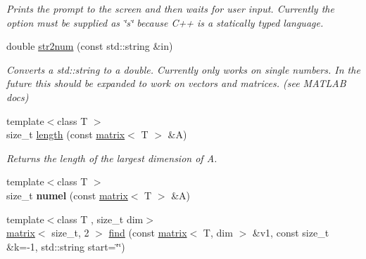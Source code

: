 \begin{DoxyCompactItemize}
\begin{DoxyCompactList}\small\item\em Prints the prompt to the screen and then waits for user input. Currently the option must be supplied as \char`\"{}s\char`\"{} because C++ is a statically typed language. \end{DoxyCompactList}\item 
\hypertarget{namespacekeycpp_a4bca7924aad17a920f2f5f0606e6d9a9}{double \hyperlink{namespacekeycpp_a4bca7924aad17a920f2f5f0606e6d9a9}{str2num} (const std\-::string \&in)}\label{namespacekeycpp_a4bca7924aad17a920f2f5f0606e6d9a9}

\begin{DoxyCompactList}\small\item\em Converts a std\-::string to a double. Currently only works on single numbers. In the future this should be expanded to work on vectors and matrices. (see M\-A\-T\-L\-A\-B docs) \end{DoxyCompactList}\item 
\hypertarget{namespacekeycpp_a9c30ad952d4422425a171c12bdf33947}{{\footnotesize template$<$class T $>$ }\\size\-\_\-t \hyperlink{namespacekeycpp_a9c30ad952d4422425a171c12bdf33947}{length} (const \hyperlink{classkeycpp_1_1matrix}{matrix}$<$ T $>$ \&A)}\label{namespacekeycpp_a9c30ad952d4422425a171c12bdf33947}

\begin{DoxyCompactList}\small\item\em Returns the length of the largest dimension of A. \end{DoxyCompactList}\item 
\hypertarget{namespacekeycpp_adcbcd3d38aa0721f2556422eb06cad7d}{{\footnotesize template$<$class T $>$ }\\size\-\_\-t {\bfseries numel} (const \hyperlink{classkeycpp_1_1matrix}{matrix}$<$ T $>$ \&A)}\label{namespacekeycpp_adcbcd3d38aa0721f2556422eb06cad7d}

\item 
\hypertarget{namespacekeycpp_a1ff2731f68b07dddedc5d572a409ba9e}{{\footnotesize template$<$class T , size\-\_\-t dim$>$ }\\\hyperlink{classkeycpp_1_1matrix}{matrix}$<$ size\-\_\-t, 2 $>$ \hyperlink{namespacekeycpp_a1ff2731f68b07dddedc5d572a409ba9e}{find} (const \hyperlink{classkeycpp_1_1matrix}{matrix}$<$ T, dim $>$ \&v1, const size\-\_\-t \&k=-\/1, std\-::string start=\char`\"{}\char`\"{})}\label{namespacekeycpp_a1ff2731f68b07dddedc5d572a409ba9e}


\end{DoxyCompactItemize}
